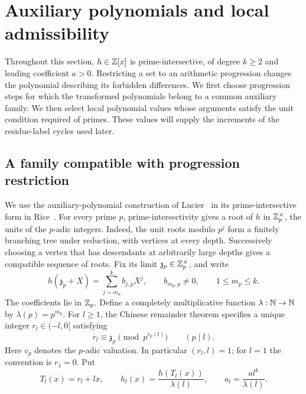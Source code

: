 \section{Auxiliary polynomials and local admissibility}\label{sec:local}

Throughout this section, $h\in\mathbb Z[x]$ is prime-intersective, of
degree $k\ge2$ and leading coefficient $a>0$.
Restricting a set to an arithmetic progression changes the polynomial
describing its forbidden differences.  We first choose progression steps
for which the transformed polynomials belong to a common auxiliary family.
We then select local polynomial values whose
arguments satisfy the unit condition required of primes.  These values will
supply the increments of the residue-label cycles used later.

\subsection{A family compatible with progression restriction}

We use the auxiliary-polynomial construction of Lucier~\cite{Lucier2006}
in its prime-intersective form in Rice~\cite[Section~2.1]{Rice2013}.
For every prime $p$, prime-intersectivity gives a root of $h$ in
$\mathbb Z_p^\times$, the units of the $p$-adic integers.  Indeed, the unit
roots modulo $p^j$ form a finitely branching tree under reduction, with
vertices at every depth.  Successively choosing a vertex that has descendants
at arbitrarily large depths gives a compatible sequence of roots.  Fix its
limit $\mathfrak z_p\in\mathbb Z_p^\times$, and write
\begin{equation}\label{eq:root-expansion}
 h(\mathfrak z_p+X)=\sum_{j=m_p}^k b_{j,p}X^j,
 \qquad b_{m_p,p}\ne0,\qquad 1\le m_p\le k.
\end{equation}
The coefficients lie in $\mathbb Z_p$.  Define a completely multiplicative
function $\lambda:\mathbb N\to\mathbb N$ by $\lambda(p)=p^{m_p}$.
For $l\ge1$, the Chinese remainder theorem specifies a unique integer
$r_l\in(-l,0]$ satisfying
\[
 r_l\equiv\mathfrak z_p\pmod{p^{v_p(l)}}\qquad(p\mid l).
\]
Here $v_p$ denotes the $p$-adic valuation.  In particular $(r_l,l)=1$;
for $l=1$ the convention is $r_1=0$.  Put
\begin{equation}\label{eq:auxiliary-definition}
 T_l(x)=r_l+lx,\qquad
 h_l(x)=\frac{h(T_l(x))}{\lambda(l)},\qquad
 a_l=\frac{a l^k}{\lambda(l)}.
\end{equation}

